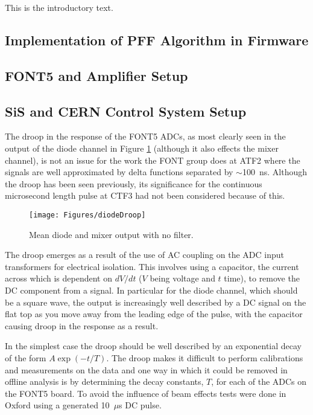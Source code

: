 
This is the introductory text.


\subsection{Implementation of PFF Algorithm in Firmware}
\label{ss:pffFirmware}

\subsection{FONT5 and Amplifier Setup}
\label{ss:fontSetup}

\subsection{SiS and CERN Control System Setup}
\label{ss:sisSetup}


The droop in the response of the FONT5 ADCs, as most clearly seen in the output of the diode channel in Figure \ref{f:diodeDroop} (although it also effects the mixer channel), is not an issue for the work the FONT group does at ATF2 where the signals are well approximated by delta functions separated by \(\sim\)100~ns. Although the droop has been seen previously, its significance for the continuous microsecond length pulse at CTF3 had not been considered because of this.

\begin{figure}
  \centering
  \texttt{[image: Figures/diodeDroop]}
  \caption{Mean diode and mixer output with no filter.}
  \label{f:diodeDroop}
\end{figure}

The droop emerges as a result of the use of AC coupling on the ADC input transformers for electrical isolation. This involves using a capacitor, the current across which is dependent on \({dV}/{dt}\) (\(V\) being voltage and \(t\) time), to remove the DC component from a signal. In particular for the diode channel, which should be a square wave, the output is increasingly well described by a DC signal on the flat top as you move away from the leading edge of the pulse, with the capacitor causing droop in the response as a result.

In the simplest case the droop should be well described by an exponential decay of the form \(A\exp\left(-t/T\right)\). The droop makes it difficult to perform calibrations and measurements on the data and one way in which it could be removed in offline analysis is by determining the decay constants, \(T\), for each of the ADCs on the FONT5 board. To avoid the influence of beam effects tests were done in Oxford using a generated 10~\(\mu\)s DC pulse.

